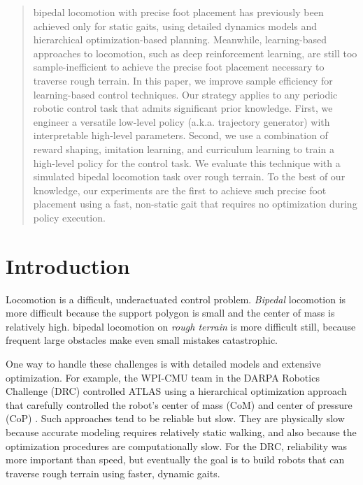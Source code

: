 \documentclass[conference]{IEEEtran}
\begin{document}
\begin{abstract}
  bipedal locomotion with precise foot placement has previously been achieved only for static gaits, using detailed dynamics models and hierarchical optimization-based planning.
  Meanwhile, learning-based approaches to locomotion, such as deep reinforcement learning, are still too sample-inefficient to achieve the precise foot placement necessary to traverse rough terrain.
  In this paper, we improve sample efficiency for learning-based control techniques.
  Our strategy applies to any periodic robotic control task that admits significant prior knowledge.
  First, we engineer a versatile low-level policy (a.k.a. trajectory generator) with interpretable high-level parameters.
  Second, we use a combination of reward shaping, imitation learning, and curriculum learning to train a high-level policy for the control task.
  We evaluate this technique with a simulated bipedal locomotion task over rough terrain.
  To the best of our knowledge, our experiments are the first to achieve such precise foot placement
  using a fast, non-static gait that requires no optimization during policy execution.
\end{abstract}

\IEEEpeerreviewmaketitle


\section{Introduction} \label{sec:intro}

Locomotion is a difficult, underactuated control problem.
\emph{Bipedal} locomotion is more difficult because the support polygon is small and the center of mass is relatively high.
bipedal locomotion on \emph{rough terrain} is more difficult still, because frequent large obstacles make even small mistakes catastrophic.

One way to handle these challenges is with detailed models and extensive optimization.
For example, the WPI-CMU team in the DARPA Robotics Challenge (DRC) controlled ATLAS using a hierarchical optimization approach that carefully controlled the robot's center of mass (CoM) and center of pressure (CoP) \citep{feng2015optimization}.
Such approaches tend to be reliable but slow.
They are physically slow because accurate modeling requires relatively static walking, and also because the optimization procedures are computationally slow.
For the DRC, reliability was more important than speed, but eventually the goal is to build robots that can traverse rough terrain using faster, dynamic gaits.
\end{document}
